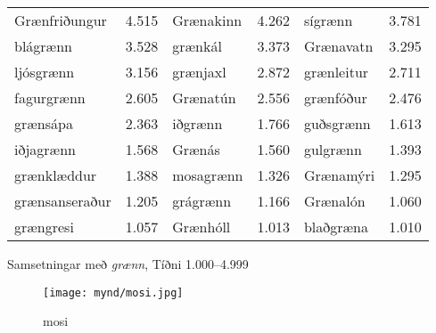 \documentclass[../samsetningasafn.tex]{subfiles}
\begin{document}
\begin{wordlist}[H]
\begin{tcolorbox}

	\setlength{\extrarowheight}{3pt}
	\begin{tabular}{BlBlBl}
		Grænfriðungur		& 4.515		& 	
		Grænakinn			& 4.262		& 	
		sígrænn				& 3.781		\\ 		
		blágrænn			& 3.528		& 	
		grænkál				& 3.373		& 		
		Grænavatn			& 3.295		\\ 	
		ljósgrænn			& 3.156		& 	
		grænjaxl				& 2.872		& 		
		grænleitur			& 2.711 		\\ 	
		fagurgrænn			& 2.605		& 	
		Grænatún			& 2.556		& 	
		grænfóður			& 2.476		\\ 
		grænsápa			& 2.363 		& 		
		iðgrænn				& 1.766		& 		
		guðsgrænn			& 1.613		\\ 		
		iðjagrænn			& 1.568		& 
		Grænás				& 1.560		& 	
		gulgrænn			& 1.393		\\ 
		grænklæddur		& 1.388		& 		
		mosagrænn			& 1.326		& 		
		Grænamýri			& 1.295		\\ 	
		grænsanseraður		& 1.205		& 		
		grágrænn			& 1.166		& 	
		Grænalón			& 1.060		\\ 		
		grængresi			& 1.057		& 	
		Grænhóll			& 1.013		& 		
		blaðgræna			& 1.010		 	
	\end{tabular}

\end{tcolorbox}
	\caption{Samsetningar með \textit{grænn}, Tíðni 1.000--4.999}
	\label{listi:graent.1000}
\end{wordlist}

\begin{figure}[H]
\begin{tcolorbox}
\centering
	\texttt{[image: mynd/mosi.jpg]}
\end{tcolorbox}
	\caption{mosi}
	\label{mynd:mosi}
\end{figure}
\end{document}
